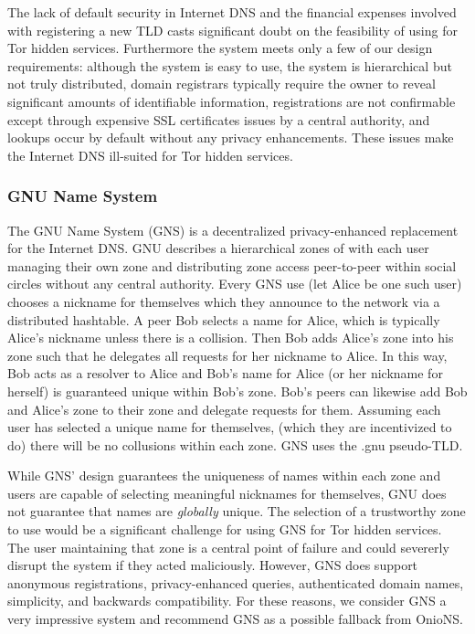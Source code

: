 \documentclass{sig-alternate}
\begin{document}
The lack of default security in Internet DNS and the financial expenses involved with registering a new TLD casts significant doubt on the feasibility of using for Tor hidden services. Furthermore the system meets only a few of our design requirements: although the system is easy to use, the system is hierarchical but not truly distributed, domain registrars typically require the owner to reveal significant amounts of identifiable information, registrations are not confirmable except through expensive SSL certificates issues by a central authority, and lookups occur by default without any privacy enhancements. These issues make the Internet DNS ill-suited for Tor hidden services.

\subsubsection{GNU Name System}

The GNU Name System\cite{wachs2014censorship} (GNS) is a decentralized privacy-enhanced replacement for the Internet DNS. GNU describes a hierarchical zones of with each user managing their own zone and distributing zone access peer-to-peer within social circles without any central authority. Every GNS use (let Alice be one such user) chooses a nickname for themselves which they announce to the network via a distributed hashtable. A peer Bob selects a name for Alice, which is typically Alice's nickname unless there is a collision. Then Bob adds Alice's zone into his zone such that he delegates all requests for her nickname to Alice. In this way, Bob acts as a resolver to Alice and Bob's name for Alice (or her nickname for herself) is guaranteed unique within Bob's zone. Bob's peers can likewise add Bob and Alice's zone to their zone and delegate requests for them. Assuming each user has selected a unique name for themselves, (which they are incentivized to do) there will be no collusions within each zone. GNS uses the .gnu pseudo-TLD.

While GNS' design guarantees the uniqueness of names within each zone and users are capable of selecting meaningful nicknames for themselves, GNU does not guarantee that names are \emph{globally} unique. The selection of a trustworthy zone to use would be a significant challenge for using GNS for Tor hidden services. The user maintaining that zone is a central point of failure and could severerly disrupt the system if they acted maliciously. However, GNS does support anonymous registrations, privacy-enhanced queries, authenticated domain names, simplicity, and backwards compatibility. For these reasons, we consider GNS a very impressive system and recommend GNS as a possible fallback from OnioNS.
\end{document}
